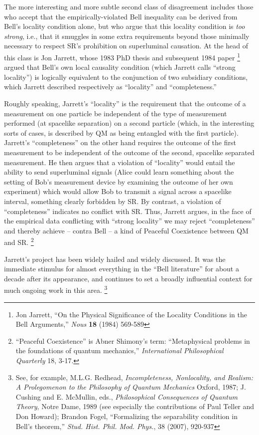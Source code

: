 \documentclass[12pt]{article}
\begin{document}
The more interesting and more subtle second class of disagreement 
includes those who accept that the empirically-violated Bell
inequality can be derived from Bell's locality condition alone, but
who argue that this locality condition is \emph{too strong}, i.e., 
that it smuggles in some extra requirements beyond those
minimally necessary to respect SR's prohibition on superluminal
causation.  At the head of this class is Jon Jarrett, whose 1983 
PhD thesis and subsequent 1984 paper%
\footnote{Jon Jarrett, ``On the Physical Significance of the Locality
  Conditions in the Bell Arguments,'' \emph{Nous} {\bf{18}} (1984) 569-589}
argued that Bell's own local causality condition (which Jarrett calls 
``strong locality'') is logically equivalent to
the conjunction of two subsidiary conditions, which Jarrett described
respectively as ``locality'' and ``completeness.'' 

Roughly speaking, Jarrett's ``locality'' is the requirement that the
outcome of a measurement on one particle be independent of the type of
measurement performed (at spacelike separation) on a second particle
(which, in the interesting sorts of cases, is described by QM as being
entangled with the first particle).  Jarrett's ``completeness'' on the
other hand requires the outcome of the first measurement to be
independent of the outcome of the second, spacelike separated
measurement.  He then argues that a violation of ``locality'' would
entail the ability to send superluminal signals (Alice could learn
something about the setting of Bob's measurement device by examining
the outcome of her own experiment) which would allow Bob to transmit
a signal across a spacelike interval, something clearly forbidden
by SR.  By contrast, a violation of ``completeness'' indicates no
conflict with SR.  Thus, Jarrett
argues, in the face of the empirical data conflicting with ``strong
locality'' we may reject ``completeness'' and thereby achieve -- contra
Bell -- a kind of Peaceful Coexistence between QM and SR.%
\footnote{``Peaceful Coexistence'' is Abner Shimony's term:  
  ``Metaphysical problems in the foundations of quantum mechanics,''
  \emph{International Philosophical Quarterly} 18, 3-17.}

Jarrett's project has been widely hailed and widely discussed.  It was
the immediate stimulus for almost everything in the ``Bell
literature'' for about a decade after its appearance, and continues to
set a broadly influential context for much ongoing work in this area.%
\footnote{See, for example, M.L.G. Redhead, \emph{Incompleteness,
    Nonlocality, and Realism: A Prolegomenon to the Philosophy of
    Quantum Mechanics} Oxford, 1987; J. Cushing and E. McMullin, eds.,
  \emph{Philosophical Consequences of Quantum Theory}, Notre Dame,
  1989 (see especially the contributions of Paul Teller and Don
  Howard); Brandon Fogel, ``Formalizing the separability condition in
  Bell's theorem,'' \emph{Stud. Hist. Phil. Mod. Phys.}, 38 (2007),
  920-937} 
\end{document}

